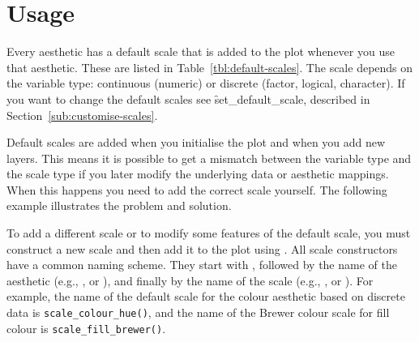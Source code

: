 \section{Usage}
\label{sec:scale-usage}

Every aesthetic has a default scale that is added to the plot whenever you use that aesthetic. These are listed in Table~\ref{tbl:default-scales}. The scale depends on the variable type: continuous (numeric) or discrete (factor, logical, character). If you want to change the default scales see \f{set_default_scale}, described in Section~\ref{sub:customise-scales}. 

Default scales are added when you initialise the plot and when you add new layers. This means it is possible to get a mismatch between the variable type and the scale type if you later modify the underlying data or aesthetic mappings. When this happens you need to add the correct scale yourself. The following example illustrates the problem and solution. 

% 
% 
% 


To add a different scale or to modify some features of the default scale, you must construct a new scale and then add it to the plot using \code{+}. \indexc{+} All scale constructors have a common naming scheme.  They start with , followed by the name of the aesthetic (e.g., ,  or ), and finally by the name of the scale (e.g., ,  or ). For example, the name of the default scale for the colour aesthetic based on discrete data is {\tt scale\_colour\_hue()}, and the name of the Brewer colour scale for fill colour is {\tt scale\_fill\_brewer()}. 


